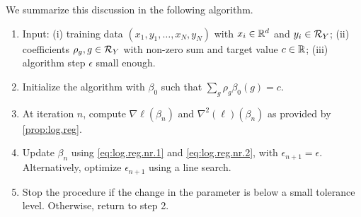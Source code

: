 We summarize this discussion in the following algorithm.
\begin{algorithm}
\label{alg:log.reg.nr}
\begin{enumerate}[label=(\arabic*)]
\item Input: (i) training data $(x_1, y_1, \ldots, x_N, y_N)$ with $x_i\in {\mathbb{R}}^d$ and $y_i\in{\mathcal R}_Y$; (ii) coefficients $\rho_g, g\in {\mathcal R}_Y$ with non-zero sum and target value $c\in{\mathbb{R}}$; (iii) algorithm step $\epsilon$ small enough.
\item Initialize the algorithm with $\beta_0$ such that $\sum_{g} \rho_g \beta_0(g) = c$.
\item At iteration $n$, compute $\nabla \ell(\beta_n)$ and $\nabla^2(\ell)(\beta_n)$ as provided by \cref{prop:log.reg}.
\item
Update $\beta_n$ using \cref{eq:log.reg.nr.1} and \cref{eq:log.reg.nr.2},  with $\epsilon_{n+1} = \epsilon$. Alternatively, optimize  $\epsilon_{n+1}$ using a line search.
\item Stop the procedure if the change in the parameter is below a small tolerance level. Otherwise, return to step 2.
\end{enumerate}
\end{algorithm}

%
%


